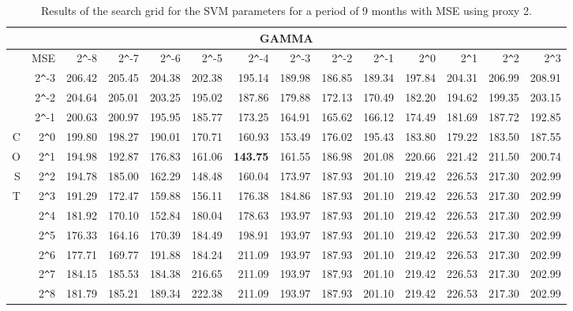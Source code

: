 \begin{table}[h!]
\centering
\begin{adjustbox}{width=\textwidth}
\begin{tabular}{|r|r|rrrrrrrrrrrr|}
\hline
\multicolumn{14}{|c|}{GAMMA} \tabularnewline
 \hline
 &MSE& 2\verb|^|-8 & 2\verb|^|-7 & 2\verb|^|-6 & 2\verb|^|-5 & 2\verb|^|-4 & 2\verb|^|-3 & 2\verb|^|-2 & 2\verb|^|-1 & 2\verb|^|0 & 2\verb|^|1 & 2\verb|^|2 & 2\verb|^|3 \\ 
  \hline
  &2\verb|^|-3 & 206.42 & 205.45 & 204.38 & 202.38 & 195.14 & 189.98 & 186.85 & 189.34 & 197.84 & 204.31 & 206.99 & 208.91 \\ 
  &2\verb|^|-2 & 204.64 & 205.01 & 203.25 & 195.02 & 187.86 & 179.88 & 172.13 & 170.49 & 182.20 & 194.62 & 199.35 & 203.15 \\ 
  &2\verb|^|-1 & 200.63 & 200.97 & 195.95 & 185.77 & 173.25 & 164.91 & 165.62 & 166.12 & 174.49 & 181.69 & 187.72 & 192.85 \\ 
  C&2\verb|^|0 & 199.80 & 198.27 & 190.01 & 170.71 & 160.93 & 153.49 & 176.02 & 195.43 & 183.80 & 179.22 & 183.50 & 187.55 \\ 
  O&2\verb|^|1 & 194.98 & 192.87 & 176.83 & 161.06 & \textbf{143.75} & 161.55 & 186.98 & 201.08 & 220.66 & 221.42 & 211.50 & 200.74 \\ 
  S&2\verb|^|2 & 194.78 & 185.00 & 162.29 & 148.48 & 160.04 & 173.97 & 187.93 & 201.10 & 219.42 & 226.53 & 217.30 & 202.99 \\ 
  T&2\verb|^|3 & 191.29 & 172.47 & 159.88 & 156.11 & 176.38 & 184.86 & 187.93 & 201.10 & 219.42 & 226.53 & 217.30 & 202.99 \\ 
  &2\verb|^|4 & 181.92 & 170.10 & 152.84 & 180.04 & 178.63 & 193.97 & 187.93 & 201.10 & 219.42 & 226.53 & 217.30 & 202.99 \\ 
  &2\verb|^|5 & 176.33 & 164.16 & 170.39 & 184.49 & 198.91 & 193.97 & 187.93 & 201.10 & 219.42 & 226.53 & 217.30 & 202.99 \\ 
  &2\verb|^|6 & 177.71 & 169.77 & 191.88 & 184.24 & 211.09 & 193.97 & 187.93 & 201.10 & 219.42 & 226.53 & 217.30 & 202.99 \\ 
  &2\verb|^|7 & 184.15 & 185.53 & 184.38 & 216.65 & 211.09 & 193.97 & 187.93 & 201.10 & 219.42 & 226.53 & 217.30 & 202.99 \\ 
  &2\verb|^|8 & 181.79 & 185.21 & 189.34 & 222.38 & 211.09 & 193.97 & 187.93 & 201.10 & 219.42 & 226.53 & 217.30 & 202.99 \\ 
   \hline
\end{tabular}
\end{adjustbox}
\caption{Results of the search grid for the SVM parameters for a period of 9 months with MSE using proxy 2.}
\end{table}